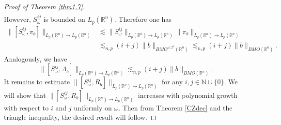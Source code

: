 \documentclass[oneside,english,a4wide]{amsart}
\numberwithin{equation}{section}
\numberwithin{figure}{section}
\theoremstyle{plain}
\theoremstyle{plain}
\theoremstyle{definition}
\theoremstyle{plain}
\theoremstyle{remark}
\theoremstyle{definition}
\theoremstyle{remark}
\theoremstyle{definition}
\newcommand{\8}{\infty}
\begin{document}
\begin{proof}[Proof of Theorem \ref{thm1.7}]
\begin{equation*}
\begin{aligned}
	\end{aligned}
\end{equation*}
However, $S_\omega^{ij}$ is bounded on $L_p(\mathbb{R}^n)$. Therefore one has
\begin{equation*}
	\begin{aligned}
		\|[S_\omega^{ij},\pi_b]\|_{L_p(\mathbb{R}^n)\to L_p(\mathbb{R}^n)}&\lesssim \|S_\omega^{ij}\|_{L_p(\mathbb{R}^n)\to L_p(\mathbb{R}^n)}\|\pi_b\|_{L_p(\mathbb{R}^n)\to L_p(\mathbb{R}^n)}\\
		&\lesssim_{n,p} (i+j)\|b\|_{BMO^{\omega, 2^n}(\mathbb{R}^n)}\lesssim_{n,p} (i+j)\|b\|_{BMO(\mathbb{R}^n)}.
	\end{aligned}
\end{equation*}
Analogously, we have
$$ \|[S_\omega^{ij},\varLambda_b]\|_{L_p(\mathbb{R}^n)\to L_p(\mathbb{R}^n)}\lesssim_{n,p} (i+j)\|b\|_{BMO(\mathbb{R}^n)}.$$
It remains to estimate $\|[S_\omega^{ij}, R_b]\|_{L_p(\mathbb{R}^n)\to L_p(\mathbb{R}^n)}$ for any $i, j\in \mathbb{N}\cup\{0\}$. We will show that $\|[S^{ij}_\omega,R_b]\|_{L_p(\mathbb{R}^n)\to L_p(\mathbb{R}^n)}$ increases with polynomial growth with respect to $i$ and $j$ uniformly on $\omega$. Then from Theorem \ref{CZdec} and the triangle inequality, the desired result will follow.


\end{proof}
\end{document}
